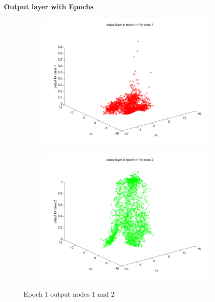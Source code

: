 \documentclass{article}
\begin{document}
\newpage
\textbf{Output layer with Epochs \\[10pt]}
\begin{figure}
\begin{subfigure}{.5\textwidth}
  \centering
  \includegraphics[width=.8\linewidth]{Classification/overlapping/1_1}
 
\end{subfigure}%
\begin{subfigure}{.5\textwidth}
  \centering
  \includegraphics[width=.8\linewidth]{Classification/overlapping/1_2}
  \end{subfigure}
\caption{Epoch 1 output nodes 1 and 2}
\end{figure}
\end{document}
